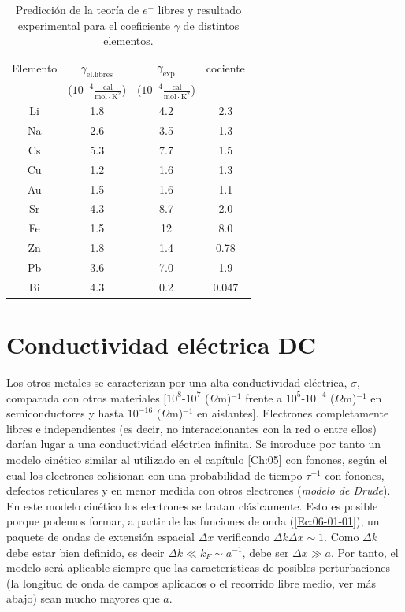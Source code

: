 \begin{table}[h!] \centering
	\begin{tabular}{cccc} 
		Elemento & $\gamma_{\text{el.libres}}$ &  $\gamma_{\text{exp}}$ & cociente \\
 		& ($10^{-4} \frac{\text{cal}}{\text{mol}\cdot\text{K}^2}$) & ($10^{-4} \frac{\text{cal}}{\text{mol}\cdot\text{K}^2}$)  &  \\ \hline
 		Li & 1.8 & 4.2 & 2.3 \\
 		Na & 2.6 & 3.5 & 1.3 \\
 		Cs & 5.3 & 7.7 & 1.5 \\
 		Cu & 1.2 & 1.6 & 1.3 \\
 		Au & 1.5 & 1.6 & 1.1 \\
 		Sr & 4.3 & 8.7 & 2.0 \\
 		Fe & 1.5 & 12 & 8.0 \\
 		Zn & 1.8 & 1.4 & 0.78 \\
 		Pb & 3.6 & 7.0 & 1.9 \\
 		Bi & 4.3 & 0.2 & 0.047 
	\end{tabular}	
	\caption{Predicción de la teoría de $e^-$ libres y resultado experimental para el coeficiente $\gamma$ de distintos elementos.}
	\label{Tab:06-01}
\end{table}

\section{Conductividad eléctrica DC}

Los otros metales se caracterizan por una alta conductividad eléctrica, $\sigma$, comparada con otros materiales [$10^8$-$10^7$ ($\Omega$m)$^{-1}$ frente a $10^5$-$10^{-4}$ ($\Omega$m)$^{-1}$ en semiconductores y hasta $10^{-16}$ ($\Omega$m)$^{-1}$ en aislantes]. Electrones completamente libres e independientes (es decir, no interaccionantes con la red o entre ellos) darían lugar a una conductividad eléctrica infinita. Se introduce por tanto un modelo cinético similar al utilizado en el capítulo \ref{Ch:05} con fonones, según el cual los electrones colisionan con una probabilidad de tiempo $\tau^{-1}$ con fonones, defectos reticulares y en menor medida con otros electrones (\textit{modelo de Drude}). En este modelo cinético los electrones se tratan clásicamente. Esto es posible porque podemos formar, a partir de las funciones de onda (\ref{Ec:06-01-01}), un paquete de ondas de extensión espacial $\Delta x$ verificando $\Delta k \Delta x \sim 1$. Como $\Delta k$ debe estar bien definido, es decir $\Delta k \ll k_F \sim a^{-1}$, debe ser $\Delta x \gg a$. Por tanto, el modelo será aplicable siempre que las características de posibles perturbaciones (la longitud de onda de campos aplicados o el recorrido libre medio, ver más abajo) sean mucho mayores que $a$. 

